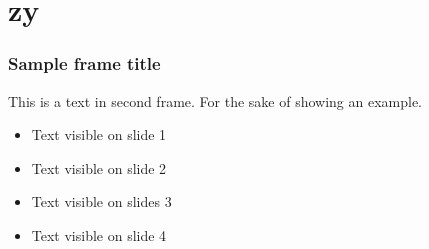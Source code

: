 \section{zy}

\begin{frame}
\frametitle{Sample frame title}
This is a text in second frame. For the sake of showing an example.

\begin{itemize}
    \item<1-> Text visible on slide 1
    \item<2-> Text visible on slide 2
    \item<3> Text visible on slides 3
    \item<4-> Text visible on slide 4
\end{itemize}
\end{frame}

